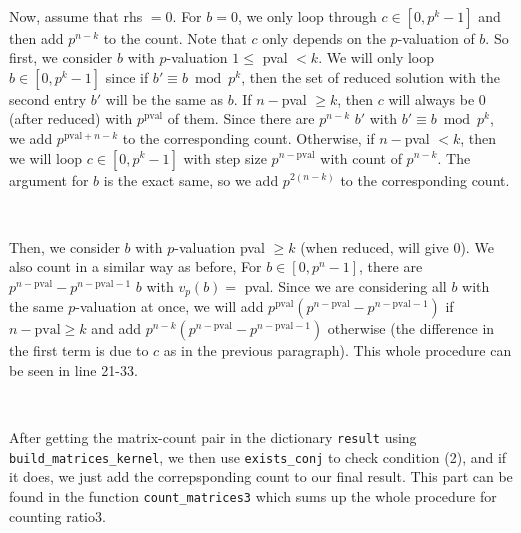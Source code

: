 \documentclass[letterpaper,12pt]{article}
\begin{document}
\

Now, assume that rhs $= 0$.
For $b=0$, we only loop through $c \in [0, p^k-1]$
and then add $p^{n-k}$ to the count.
Note that $c$ only depends on the $p$-valuation of $b$.
So first, we consider $b$ with $p$-valuation $1 \leq $ pval $ < k$.
We will only loop $b \in [0, p^k-1]$ since if 
$b' \equiv b \bmod p^k$, then the set of reduced solution with the second entry $b'$
will be the same as $b$.
If $n-$pval $\geq k$, then $c$ will always be 0 (after reduced) with $p^{\text{pval}}$ of them.
Since there are $p^{n-k}$ $b'$ with $b' \equiv b \bmod p^k$,
we add $p^{\text{pval}+n-k}$ to the corresponding count.
Otherwise, if $n-$pval $<k$, then we will loop 
$c\in [0, p^k-1]$ with step size $p^{n-\text{pval}}$ with count of $p^{n-k}$.
The argument for $b$ is the exact same, so we add $p^{2(n-k)}$
to the corresponding count.

\

Then, we consider $b$ with $p$-valuation pval $\geq k$ 
(when reduced, will give 0). We also count in a similar way as before, 
For $b \in [0, p^n-1]$, there are $p^{n-\text{pval}} - p^{n-\text{pval}-1}$
$b$ with $v_p(b) = $ pval.
Since we are considering all $b$ with the same $p$-valuation at once, 
we will add $p^{\text{pval}} (p^{n-\text{pval}} - p^{n-\text{pval}-1})$
if $n-\text{pval} \geq k$ and add 
$p^{n-k} (p^{n-\text{pval}} - p^{n-\text{pval}-1})$ otherwise
(the difference in the first term is due to $c$ as in the previous paragraph).
This whole procedure can be seen in line 21-33.

\

After getting the matrix-count pair in the dictionary \texttt{result} 
using \texttt{build\_matrices\_kernel}, we then use 
\texttt{exists\_conj} to check condition (2), and if it does, 
we just add the correpsponding count to our final result.
This part can be found in the function \texttt{count\_matrices3}
which sums up the whole procedure for counting ratio3.


\end{document}
